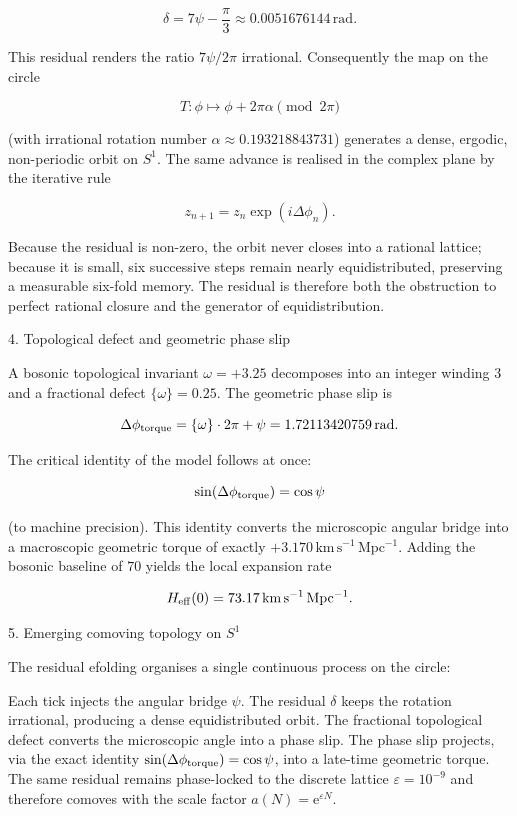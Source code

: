 \[
\delta=7\psi-\frac{\pi}{3}\approx0.0051676144\,\text{rad}.
\]

This residual renders the ratio \(7\psi/2\pi\) irrational. Consequently the map on the circle

\[
T:\phi\mapsto\phi+2\pi\alpha\pmod{2\pi}
\]

(with irrational rotation number \(\alpha\approx0.193218843731\)) generates a dense, ergodic, non-periodic orbit on \(S^1\). The same advance is realised in the complex plane by the iterative rule

\[
z_{n+1}=z_n\exp(i\Delta\phi_n).
\]

Because the residual is non-zero, the orbit never closes into a rational lattice; because it is small, six successive steps remain nearly equidistributed, preserving a measurable six-fold memory. The residual is therefore both the obstruction to perfect rational closure and the generator of equidistribution.

4. Topological defect and geometric phase slip

A bosonic topological invariant \(\omega=+3.25\) decomposes into an integer winding \(3\) and a fractional defect \(\{\omega\}=0.25\). The geometric phase slip is

\[
\Delta\phi_{\rm torque}=\{\omega\}\cdot2\pi+\psi=1.72113420759\,\text{rad}.
\]

The critical identity of the model follows at once:

\[
\sin(\Delta\phi_{\rm torque})=\cos\psi
\]

(to machine precision). This identity converts the microscopic angular bridge into a macroscopic geometric torque of exactly \(+3.170\,\mathrm{km\,s^{-1}\,Mpc^{-1}}\). Adding the bosonic baseline of \(70\) yields the local expansion rate

\[
H_{\rm eff}(0)=73.17\,\mathrm{km\,s^{-1}\,Mpc^{-1}}.
\]

5. Emerging comoving topology on \(S^1\)

The residual efolding organises a single continuous process on the circle:

Each tick injects the angular bridge \(\psi\).
The residual \(\delta\) keeps the rotation irrational, producing a dense equidistributed orbit.
The fractional topological defect converts the microscopic angle into a phase slip.
The phase slip projects, via the exact identity \(\sin(\Delta\phi_{\rm torque})=\cos\psi\), into a late-time geometric torque.
The same residual remains phase-locked to the discrete lattice \(\varepsilon=10^{-9}\) and therefore comoves with the scale factor \(a(N)=\mathrm{e}^{\varepsilon N}\).

